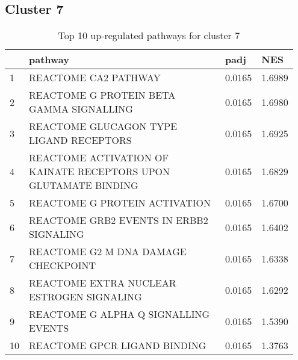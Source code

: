 \documentclass{article}
\begin{document}
\subsection{Cluster 7 }
\begin{table}[H]
\centering
\begin{tabular}{p{0.05\linewidth}p{0.7\linewidth}p{0.1\linewidth}p{0.1\linewidth}}
  \hline
 & pathway & padj & NES \\ 
  \hline
1 & REACTOME CA2 PATHWAY & 0.0165 & 1.6989 \\ 
  2 & REACTOME G PROTEIN BETA GAMMA SIGNALLING & 0.0165 & 1.6980 \\ 
  3 & REACTOME GLUCAGON TYPE LIGAND RECEPTORS & 0.0165 & 1.6925 \\ 
  4 & REACTOME ACTIVATION OF KAINATE RECEPTORS UPON GLUTAMATE BINDING & 0.0165 & 1.6829 \\ 
  5 & REACTOME G PROTEIN ACTIVATION & 0.0165 & 1.6700 \\ 
  6 & REACTOME GRB2 EVENTS IN ERBB2 SIGNALING & 0.0165 & 1.6402 \\ 
  7 & REACTOME G2 M DNA DAMAGE CHECKPOINT & 0.0165 & 1.6338 \\ 
  8 & REACTOME EXTRA NUCLEAR ESTROGEN SIGNALING & 0.0165 & 1.6292 \\ 
  9 & REACTOME G ALPHA Q SIGNALLING EVENTS & 0.0165 & 1.5390 \\ 
  10 & REACTOME GPCR LIGAND BINDING & 0.0165 & 1.3763 \\ 
   \hline
\end{tabular}
\caption{Top 10 up-regulated pathways for cluster 7} 
\label{tab:q3_2_7}
\end{table}
\end{document}
